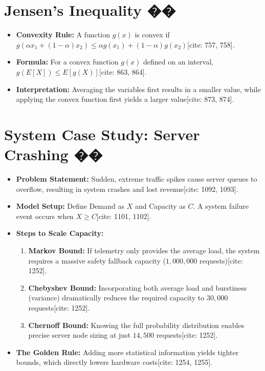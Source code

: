\documentclass{article}
\begin{document}
\section{Jensen's Inequality ��}
\begin{itemize}
    \item \textbf{Convexity Rule:} A function $g(x)$ is convex if $g(\alpha x_{1}+(1-\alpha)x_{2})\le\alpha g(x_{1})+(1-\alpha)g(x_{2})$[cite: 757, 758].
    \item \textbf{Formula:} For a convex function $g(x)$ defined on an interval, $g(E[X])\le E[g(X)]$[cite: 863, 864].
    \item \textbf{Interpretation:} Averaging the variables first results in a smaller value, while applying the convex function first yields a larger value[cite: 873, 874].
\end{itemize}

\section{System Case Study: Server Crashing ��}
\begin{itemize}
    \item \textbf{Problem Statement:} Sudden, extreme traffic spikes cause server queues to overflow, resulting in system crashes and lost revenue[cite: 1092, 1093].
    \item \textbf{Model Setup:} Define Demand as $X$ and Capacity as $C$. A system failure event occurs when $X \ge C$[cite: 1101, 1102].
    \item \textbf{Steps to Scale Capacity:}
    \begin{enumerate}
        \item \textbf{Markov Bound:} If telemetry only provides the average load, the system requires a massive safety fallback capacity ($1,000,000$ requests)[cite: 1252].
        \item \textbf{Chebyshev Bound:} Incorporating both average load and burstiness (variance) dramatically reduces the required capacity to $30,000$ requests[cite: 1252].
        \item \textbf{Chernoff Bound:} Knowing the full probability distribution enables precise server node sizing at just $14,500$ requests[cite: 1252].
    \end{enumerate}
    \item \textbf{The Golden Rule:} Adding more statistical information yields tighter bounds, which directly lowers hardware costs[cite: 1254, 1255].
\end{itemize}
\end{document}
